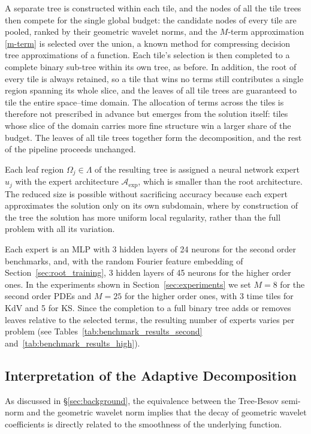A separate tree is constructed within each tile, and the nodes of all the
tile trees then compete for the single global budget: the candidate nodes of
every tile are pooled, ranked by their geometric wavelet norms, and the
$M$-term approximation \eqref{m-term} is selected over the union, a known
method for compressing decision tree approximations of a function.
Each tile's selection is then completed to a
complete binary sub-tree within its own tree, as before. In addition, the
root of every tile is always retained, so a tile that wins no terms still
contributes a single region spanning its whole slice, and the leaves of all
tile trees are guaranteed to tile the entire space--time domain. The allocation of terms across the tiles is therefore
not prescribed in advance but emerges from the solution itself: tiles whose
slice of the domain carries more fine structure win a larger share of the
budget. The leaves of all tile trees together form the decomposition, and
the rest of the pipeline proceeds unchanged.

Each leaf region $\Omega_j \in \Lambda$ of the resulting tree is assigned a neural network expert $u_j$ with the expert architecture
$\mathcal{A}_{\mathrm{exp}}$, which is smaller than the root architecture. The reduced size is possible without sacrificing accuracy because each expert approximates the solution only on its own subdomain, where by construction of the tree the solution has more uniform local regularity, rather than the full problem with all its variation. 

Each expert is an MLP with 3 hidden layers of 24 neurons for the second order benchmarks, and, with the random Fourier feature embedding of Section~\ref{sec:root_training}, 3 hidden layers of 45 neurons for the higher order ones. In the experiments shown in Section~\ref{sec:experiments} we set $M = 8$ for the second order PDEs and $M = 25$ for the higher order ones, with 3 time tiles for KdV and 5 for KS. Since the completion to a full binary tree adds or removes leaves relative to the selected terms, the resulting number of experts varies per problem (see Tables~\ref{tab:benchmark_results_second} and~\ref{tab:benchmark_results_high}).

\subsection{Interpretation of the Adaptive Decomposition}
\label{sec:interpretation}

As discussed in \S\ref{sec:background}, the equivalence between the
Tree-Besov semi-norm and the geometric wavelet norm implies that the decay of
geometric wavelet coefficients is directly related to the smoothness of the
underlying function.


